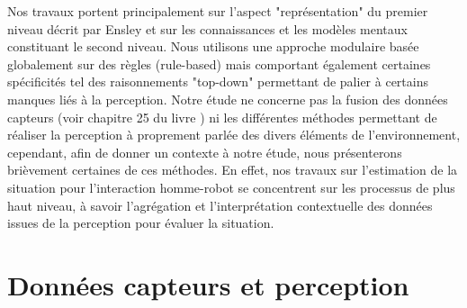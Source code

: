 \documentclass[a4paper,11pt,twoside]{StyleThese}
\begin{document}
Nos travaux portent principalement sur l'aspect "représentation" du premier niveau décrit par Ensley et sur les connaissances et les modèles mentaux constituant le second niveau.
Nous utilisons une approche modulaire basée globalement sur des règles (rule-based) mais comportant également certaines spécificités tel des raisonnements "top-down" permettant de palier à certains manques liés à la perception.
Notre étude ne concerne pas la fusion des données capteurs (voir chapitre 25 du livre \cite{siciliano2008springer}) ni les différentes méthodes permettant de réaliser la perception à proprement parlée des divers éléments de l'environnement, cependant, afin de donner un contexte à notre étude, nous présenterons brièvement certaines de ces méthodes. En effet, nos travaux sur l'estimation de la situation pour l'interaction homme-robot se concentrent sur les processus de plus haut niveau, à savoir l'agrégation et l'interprétation contextuelle des données issues de la perception pour évaluer la situation.








\section{Données capteurs et perception}
\label{sec:collecte}
\end{document}

